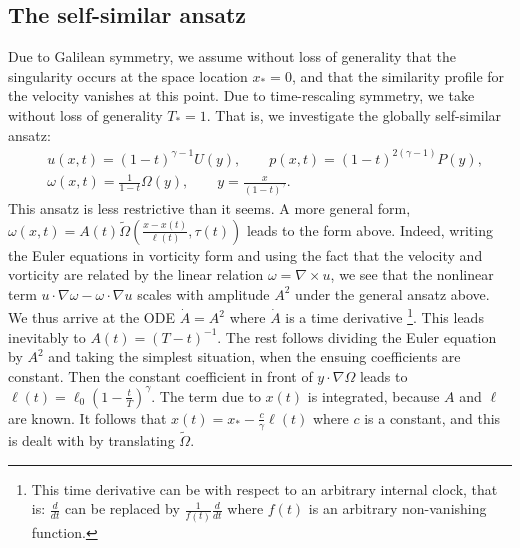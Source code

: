 \documentclass[10pt,a4paper]{amsart}
\theoremstyle{plain}
\theoremstyle{remark}
\newcommand{\fr}{\frac}
\newcommand{\na}{\nabla}
\begin{document}
\subsection{The self-similar ansatz}
\label{sec:standing:SS:ass}
Due to Galilean symmetry, we assume without loss of generality that the singularity occurs at the space location $x_*=0$, and 
that the similarity profile for the velocity vanishes at this point.  Due to time-rescaling symmetry, we  take without loss of generality $T_*=1$. 
That is, we investigate the globally self-similar ansatz:
\begin{equation}
\begin{aligned}
&u(x,t) = (1-t)^{\gamma-1} U(y)
, 
\qquad
p(x,t) = (1-t)^{2(\gamma-1)} P(y) 
,
\\
&\omega(x,t) = \frac{1}{1-t} \Omega(y) 
, 
\qquad
y = \frac{x}{(1-t)^\gamma}
.
\end{aligned}
\label{eq:SS:ansatz}
\end{equation}
This ansatz is less restrictive than it seems. A more general form, $\omega (x,t) =
A(t)\widetilde \Omega\left(\fr{x-x(t)}{\ell(t)}, \tau (t)\right)$ leads to the form above. Indeed, writing the Euler equations in vorticity form and using the fact that the velocity and vorticity are related by the linear relation
$\omega = \na\times u$, we see that the nonlinear term $u\cdot\na\omega-\omega\cdot\na u$ scales with amplitude $A^2$ under the general ansatz above. We thus arrive at the ODE $\dot A = A^2$ where $\dot A$ is a time derivative {\footnote{ This time derivative can be with respect to an arbitrary internal clock, that is: $\fr{d}{dt}$ can be replaced by $\fr{1}{f(t)}\fr{d}{dt}$ where $f(t)$ is an arbitrary non-vanishing function.}}. This leads inevitably to $A(t) = (T-t)^{-1}$. The rest follows dividing the Euler equation by $A^2$ and taking the simplest situation, when the ensuing coefficients are constant. Then the constant coefficient in front of $y\cdot\na \Omega$ leads to $\ell(t) = \ell_0\left(1 -\fr{t}{T}\right)^{\gamma}$. The term due to $x(t)$ is integrated, because $A$ and $\ell$ are known. It follows that $x(t) = x_* - \fr{c}{\gamma}\ell(t)$ where $c$ is a constant, and this is dealt with by translating $\widetilde \Omega$.

 
\end{document}
